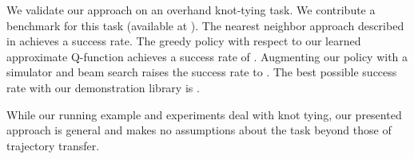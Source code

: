 We validate our approach on an overhand knot-tying task. We contribute a
benchmark for this task (available at ). The nearest
neighbor approach described in \citet{Schulmanetal_ISRR2013} achieves a
\al{\#} success rate. The greedy policy with respect to our learned
approximate Q-function achieves a success rate of \al{\#}. Augmenting our
policy with a simulator and beam search raises the success rate to \al{\#}.
The best possible success rate with our demonstration library is \al{\#}.

While our running example and experiments deal with knot tying, our presented
\mmql{} approach is general and makes no assumptions about the task
beyond those of trajectory transfer.
